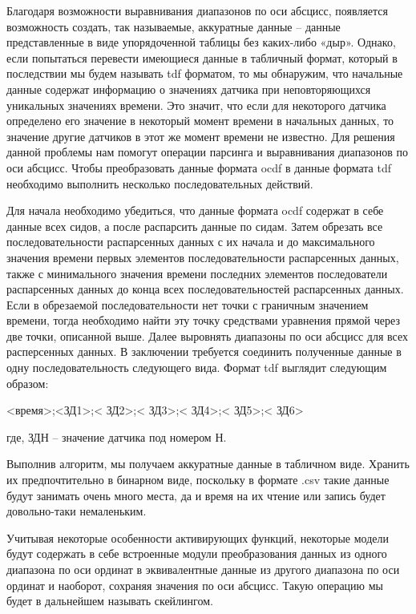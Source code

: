   \par \redline Благодаря возможности выравнивания диапазонов по оси абсцисс, появляется возможность создать, так называемые, аккуратные данные – данные представленные в виде упорядоченной таблицы без каких-либо «дыр». Однако, если попытаться перевести имеющиеся данные в табличный формат, который в последствии мы будем называть tdf форматом, то мы обнаружим, что начальные данные содержат информацию о значениях датчика при неповторяющихся уникальных значениях времени. Это значит, что если для некоторого датчика определено его значение в некоторый момент времени в начальных данных, то значение другие датчиков в этот же момент времени не известно. Для решения данной проблемы нам помогут операции парсинга и выравнивания диапазонов по оси абсцисс. Чтобы преобразовать данные формата ocdf в данные формата tdf необходимо выполнить несколько последовательных действий. 

  \par \redline Для начала необходимо убедиться, что данные формата ocdf содержат в себе данные всех сидов, а после распарсить данные по сидам. Затем обрезать все последовательности распарсенных данных с их начала и до максимального значения времени первых элементов последовательности распарсенных данных, также с минимального значения времени последних элементов последователи распарсенных данных до конца всех последовательностей распарсенных данных. Если в обрезаемой последовательности нет точки с граничным значением времени, тогда необходимо найти эту точку средствами уравнения прямой через две точки, описанной выше. Далее выровнять диапазоны по оси абсцисс для всех расперсенных данных. В заключении требуется соединить полученные данные в одну последовательность следующего вида. Формат tdf выглядит следующим образом:

  \begin{Center}
  <время>;<ЗД1>;< ЗД2>;< ЗД3>;< ЗД4>;< ЗД5>;< ЗД6>
  \end{Center}

  \par \redline где, ЗДН {--} значение датчика под номером Н. 

  \par \redline Выполнив алгоритм, мы получаем аккуратные данные в табличном виде. Хранить их предпочтительно в бинарном виде, поскольку в формате .csv такие данные будут занимать очень много места, да и время на их чтение или запись будет довольно-таки немаленьким. 

  \par \redline Учитывая некоторые особенности активирующих функций, некоторые модели будут содержать в себе встроенные модули преобразования данных из одного диапазона по оси ординат в эквивалентные данные из другого диапазона по оси ординат и наоборот, сохраняя значения по оси абсцисс. Такую операцию мы будет в дальнейшем называть скейлингом.

